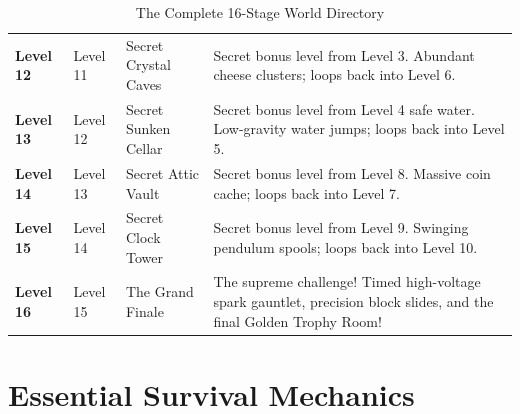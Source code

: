\documentclass[10pt,letterpaper]{article}
\begin{document}
\begin{table}[h!]
\begin{tabularx}{\linewidth}{lllX}
\textbf{Level 12} & Level 11 & Secret Crystal Caves & Secret bonus level from Level 3. Abundant cheese clusters; loops back into Level 6. \\
\textbf{Level 13} & Level 12 & Secret Sunken Cellar & Secret bonus level from Level 4 safe water. Low-gravity water jumps; loops back into Level 5. \\
\textbf{Level 14} & Level 13 & Secret Attic Vault & Secret bonus level from Level 8. Massive coin cache; loops back into Level 7. \\
\textbf{Level 15} & Level 14 & Secret Clock Tower & Secret bonus level from Level 9. Swinging pendulum spools; loops back into Level 10. \\
\midrule
\textbf{Level 16} & Level 15 & The Grand Finale & The supreme challenge! Timed high-voltage spark gauntlet, precision block slides, and the final Golden Trophy Room! \\
\bottomrule
\end{tabularx}
\caption{The Complete 16-Stage World Directory}
\end{table}

\vspace{-0.3em}

\section{Essential Survival Mechanics}
\end{document}
